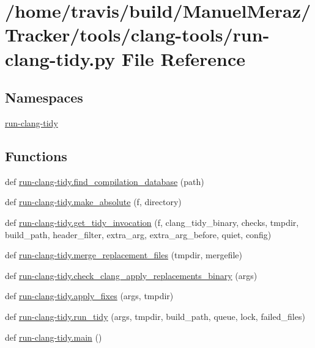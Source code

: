 \hypertarget{run-clang-tidy_8py}{}\section{/home/travis/build/\+Manuel\+Meraz/\+Tracker/tools/clang-\/tools/run-\/clang-\/tidy.py File Reference}
\label{run-clang-tidy_8py}
\subsection*{Namespaces}
\begin{DoxyCompactItemize}
\item 
 \hyperlink{namespacerun-clang-tidy}{run-\/clang-\/tidy}
\end{DoxyCompactItemize}
\subsection*{Functions}
\begin{DoxyCompactItemize}
\item 
def \hyperlink{namespacerun-clang-tidy_a6ac4a700cc424f234d870957b05abb6e}{run-\/clang-\/tidy.\+find\+\_\+compilation\+\_\+database} (path)
\item 
def \hyperlink{namespacerun-clang-tidy_a0cea255a2d9edf0a7f877bd9bdd4c75f}{run-\/clang-\/tidy.\+make\+\_\+absolute} (f, directory)
\item 
def \hyperlink{namespacerun-clang-tidy_a3cbee7957a6ad49d8a88b9c9d74a53dc}{run-\/clang-\/tidy.\+get\+\_\+tidy\+\_\+invocation} (f, clang\+\_\+tidy\+\_\+binary, checks, tmpdir, build\+\_\+path, header\+\_\+filter, extra\+\_\+arg, extra\+\_\+arg\+\_\+before, quiet, config)
\item 
def \hyperlink{namespacerun-clang-tidy_ad3aaf1ecd87ad237a6e5caeeaa4a6ad6}{run-\/clang-\/tidy.\+merge\+\_\+replacement\+\_\+files} (tmpdir, mergefile)
\item 
def \hyperlink{namespacerun-clang-tidy_ac9da9a27018bf1740f1f26c5f7657b7a}{run-\/clang-\/tidy.\+check\+\_\+clang\+\_\+apply\+\_\+replacements\+\_\+binary} (args)
\item 
def \hyperlink{namespacerun-clang-tidy_aae1fd407c48d69133cc1122940aa86ac}{run-\/clang-\/tidy.\+apply\+\_\+fixes} (args, tmpdir)
\item 
def \hyperlink{namespacerun-clang-tidy_a586db901d7ae78f0db162034b23cf68e}{run-\/clang-\/tidy.\+run\+\_\+tidy} (args, tmpdir, build\+\_\+path, queue, lock, failed\+\_\+files)
\item 
def \hyperlink{namespacerun-clang-tidy_a3a4dae083818b9d5c9104e0142e03e3b}{run-\/clang-\/tidy.\+main} ()
\end{DoxyCompactItemize}
